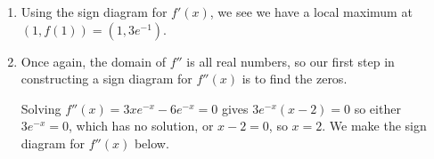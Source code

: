 \documentclass{ximera}
\begin{document}
\begin{example}
\begin{explanation}
\begin{enumerate}
\begin{image}
\begin{tikzpicture}[>=Latex, every node/.style={font=\normalsize}]
\end{tikzpicture}

\end{image}

We get $f$ is increasing on $(-\infty, 1)$ and decreasing on $(1, \infty)$.

\begin{image}

\end{image}



\item Using the sign diagram for $f'(x)$, we see we have a local maximum at $(1, f(1)) = \left(1, 3e^{-1} \right)$.



\item Once again, the domain of $f''$ is all real numbers, so our first step in constructing a sign diagram for $f''(x)$ is to find the zeros.



Solving $f''(x) = 3xe^{-x} - 6e^{-x} = 0$ gives $3e^{-x}(x-2) = 0$ so either $3e^{-x} = 0$, which has no solution, or $x-2 = 0$, so $x = 2$. We make the sign diagram for $f''(x)$ below.


\begin{image}
\end{image}
\end{enumerate}
\end{explanation}
\end{example}
\end{document}
